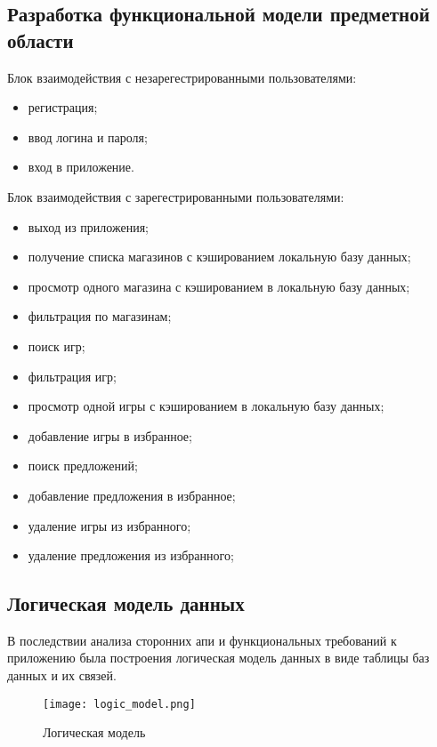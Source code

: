 \subsection{Разработка функциональной модели предметной области}

Блок взаимодействия с незарегестрированными пользователями:

\begin{itemize}
    \item регистрация;
    \item ввод логина и пароля;
    \item вход в приложение.
\end{itemize}

Блок взаимодействия с зарегестрированными пользователями:

\begin{itemize}
    \item выход из приложения;
    \item получение списка магазинов с кэшированием локальную базу данных;
    \item просмотр одного магазина с кэшированием в локальную базу данных;
    \item фильтрация по магазинам;
    \item поиск игр;
    \item фильтрация игр;
    \item просмотр одной игры с кэшированием в локальную базу данных;
    \item добавление игры в избранное;
    \item поиск предложений;
    \item добавление предложения в избранное;
    \item удаление игры из избранного;
    \item удаление предложения из избранного;
\end{itemize}


\subsection{Логическая модель данных}

В последствии анализа сторонних апи и функциональных требований к приложению была построения логическая модель данных в виде таблицы баз данных и их связей.

\begin{figure}[H]
 \centering
   \texttt{[image: logic\_model.png]} 
   \caption{Логическая модель}
   \label{fig:domain:logic_model}
\end{figure}

